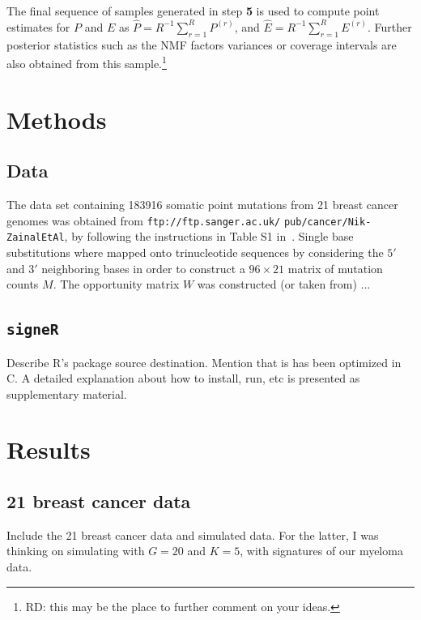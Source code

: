 \documentclass{bioinfo}
\newcommand{\CC}{C\nolinebreak\hspace{-.05em}\raisebox{.4ex}{\tiny\bf
    +}\nolinebreak\hspace{-.10em}\raisebox{.4ex}{\tiny\bf +}}
\begin{document}
The final sequence of samples generated in step \textbf{5} is used to
compute point estimates for $P$ and $E$ as $\widehat P =
R^{-1}\sum_{r=1}^R P^{(r)}$, and $\widehat E = R^{-1}\sum_{r=1}^R
E^{(r)}$. Further posterior statistics such as the NMF factors
variances or coverage intervals are also obtained from this
sample.\footnote{RD: this may be the place to further comment on your
ideas.}



\section{Methods}
\subsection{Data} The data set containing 183916 somatic point
mutations from 21 breast cancer genomes was obtained from
\verb+ftp://ftp.sanger.ac.uk/+ \verb+pub/cancer/Nik-ZainalEtAl+, by
following the instructions in Table S1 in~\cite{NCell}. Single base 
substitutions where mapped onto trinucleotide sequences by considering
the $5'$ and $3'$ neighboring bases in order to construct a $96\times
21$ matrix of mutation counts $M$. 
The opportunity matrix $W$ was constructed (or taken from) ...


\subsection{\texttt{signeR}} Describe R's package
source destination. Mention that is has been optimized in
\CC. A detailed explanation about how to install, run, etc is
presented as supplementary material.

\section{Results}
\subsection{21 breast cancer data}
Include the 21 breast cancer data and simulated data. For the latter,
I was thinking on simulating with $G=20$ and $K=5$, with signatures
of  our myeloma data. 
\end{document}
